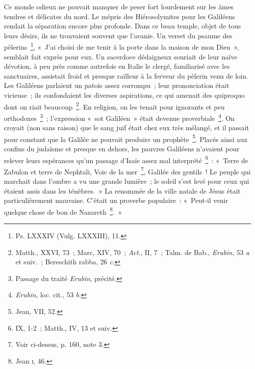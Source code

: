\documentclass[french,twoside]{book} %
\begin{document}
Ce monde odieux ne pouvait manquer de peser fort lourdement sur les âmes tendres et délicates du nord. Le mépris des Hiérosolymites pour les Galiléens rendait la séparation encore plus profonde. Dans ce beau temple, objet de tous leurs désirs, ils ne trouvaient souvent que l’avanie. Un verset du psaume des pèlerins \footnote{ Ps. LXXXIV (Vulg. LXXXIII), 11.}, « J’ai choisi de me tenir à la porte dans la maison de mon Dieu », semblait fait exprès pour eux. Un sacerdoce dédaigneux souriait de leur naïve dévotion, à peu près comme autrefois en Italie le clergé, familiarisé avec les sanctuaires, assistait froid et presque railleur à la ferveur du pèlerin venu de loin. Les Galiléens parlaient un patois assez corrompu ; leur prononciation était vicieuse ; ils confondaient les diverses aspirations, ce qui amenait des quiproquo dont on riait beaucoup \footnote{ Matth., XXVI, 73 ; Marc, XIV, 70 ; {\itshape Act}., II, 7 ; Talm. de Bab., {\itshape Erubin}, 53 {\itshape a} et suiv. ; Bereschith rabba, 26 {\itshape c}.}. En religion, on les tenait pour ignorants et peu orthodoxes \footnote{ Passage du traité {\itshape Erubin}, précité.} ; l’expression « sot Galiléen » était devenue proverbiale \footnote{{\itshape Erubin}, loc. cit., 53 {\itshape b}.}. On croyait (non sans raison) que le sang juif était chez eux très mélangé, et il passait pour constant que la Galilée ne pouvait produire un prophète \footnote{Jean, VII, 52.}. Placés ainsi aux confins du judaïsme et presque en dehors, les pauvres Galiléens n’avaient pour relever leurs espérances qu’un passage d’Isaïe assez mal interprété \footnote{IX, 1-2 ; Matth., IV, 13 et suiv.} : « Terre de Zabulon et terre de Nephtali, Voie de la mer \footnote{Voir ci-dessus, p. 160, note 3.}, Galilée des gentils ! Le peuple qui marchait dans l’ombre a vu une grande lumière ; le soleil s’est levé pour ceux qui étaient assis dans les ténèbres. » La renommée de la ville natale de Jésus était particulièrement mauvaise. C’était un proverbe populaire : « Peut-il venir quelque chose de bon de Nazareth \footnote{ Jean \textsc{i}, 46.}. »\par
\end{document}

